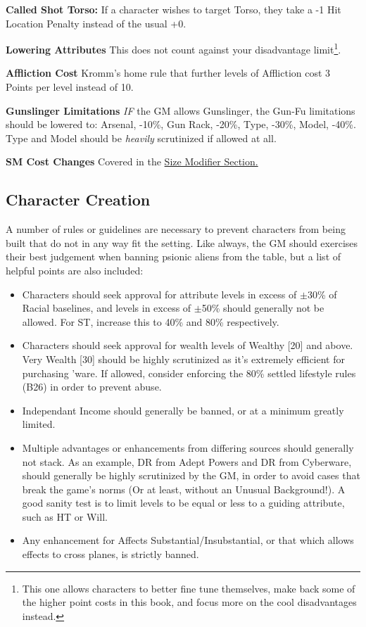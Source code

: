 \begin{multicols*}{3}
	\textbf{Called Shot Torso:} If a character wishes to target Torso, they take a -1 Hit Location Penalty instead of the usual +0.
	
	\textbf{Lowering Attributes} This does not count against your disadvantage limit\footnote{This one allows characters to better fine tune themselves, make back some of the higher point costs in this book, and focus more on the cool disadvantages instead.}.
	
	\textbf{Affliction Cost} Kromm's home rule that further levels of Affliction cost 3 Points per level instead of 10.
	
	\textbf{Gunslinger Limitations} \textit{IF} the GM allows Gunslinger, the Gun-Fu limitations should be lowered to: Arsenal, -10\%, Gun Rack, -20\%, Type, -30\%, Model, -40\%. Type and Model should be \textit{heavily} scrutinized if allowed at all.
	
	\textbf{SM Cost Changes} Covered in the \hyperref[size_modifier]{Size Modifier Section.}
	
	\subsection{Character Creation}
	
	A number of rules or guidelines are necessary to prevent characters from being built that do not in any way fit the setting. Like always, the GM should exercises their best judgement when banning psionic aliens from the table, but a list of helpful points are also included:
	
	\begin{itemize}
		\itemsep 0pt
		\item Characters should seek approval for attribute levels in excess of \(\pm\)30\% of Racial baselines, and levels in excess of \(\pm\)50\% should generally not be allowed. For ST, increase this to 40\% and 80\% respectively.
		\item Characters should seek approval for wealth levels of Wealthy [20] and above. Very Wealth [30] should be highly scrutinized as it's extremely efficient for purchasing 'ware. If allowed, consider enforcing the 80\% settled lifestyle rules (B26) in order to prevent abuse.
		\item Independant Income should generally be banned, or at a minimum greatly limited.
		\item Multiple advantages or enhancements from differing sources should generally not stack. As an example, DR from Adept Powers and DR from Cyberware, should generally be highly scrutinized by the GM, in order to avoid cases that break the game's norms (Or at least, without an Unusual Background!). A good sanity test is to limit levels to be equal or less to a guiding attribute, such as HT or Will.
		\item Any enhancement for Affects Substantial/Insubstantial, or that which allows effects to cross planes, is strictly banned.
	\end{itemize}
	

\end{multicols*}
